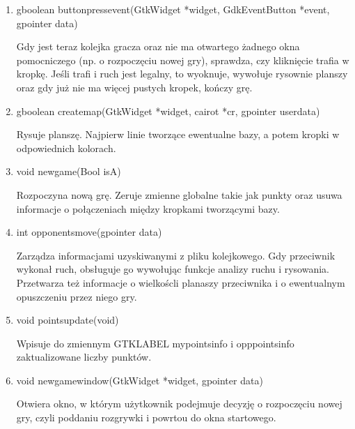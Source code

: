 \documentclass{article}
\begin{document}
\begin{enumerate}
\begin{enumerate}
Przechowuje oknko rozgrywki.

\item GtkWidget *whose\textunderscore turn

Przechowuje adres zmiennej GTK\textunderscore LABEL, która wyświetla, czy jest teraz tura gracza czy nie.

\end{enumerate}

\item gboolean button\textunderscore press\textunderscore event(GtkWidget *widget, GdkEventButton *event, gpointer data)

Gdy jest teraz kolejka gracza oraz nie ma otwartego żadnego okna pomocniczego (np. o rozpoczęciu nowej gry), sprawdza, czy kliknięcie trafia w kropkę. Jeśli trafi i ruch jest legalny, to wyoknuje, wywołuje rysownie planszy oraz gdy już nie ma więcej pustych kropek, kończy grę.

\item gboolean create\textunderscore map(GtkWidget *widget, cairo\textunderscore t *cr, gpointer user\textunderscore data)

Rysuje planszę. Najpierw linie tworzące ewentualne bazy, a potem kropki w odpowiednich kolorach.

\item void new\textunderscore game(\textunderscore Bool isA)

Rozpoczyna nową grę. Zeruje zmienne globalne takie jak punkty oraz usuwa informacje o połączeniach między kropkami tworzącymi bazy. 

\item int opponents\textunderscore move(gpointer data)

Zarządza informacjami uzyskiwanymi z pliku kolejkowego. Gdy przeciwnik wykonał ruch, obsługuje go wywołując funkcje analizy ruchu i rysowania. Przetwarza też informacje o wielkoścli planaszy przeciwnika i o ewentualnym opuszczeniu przez niego gry.

\item void points\textunderscore update(void)

Wpisuje do zmiennym GTK\textunderscore LABEL mypoints\textunderscore info i opppoints\textunderscore info zaktualizowane liczby punktów.

\item void new\textunderscore game\textunderscore window(GtkWidget *widget, gpointer data)

Otwiera okno, w którym użytkownik podejmuje decyzję o rozpoczęciu nowej gry, czyli poddaniu rozgrywki i powrtou do okna startowego.


\end{enumerate}
\end{document}

